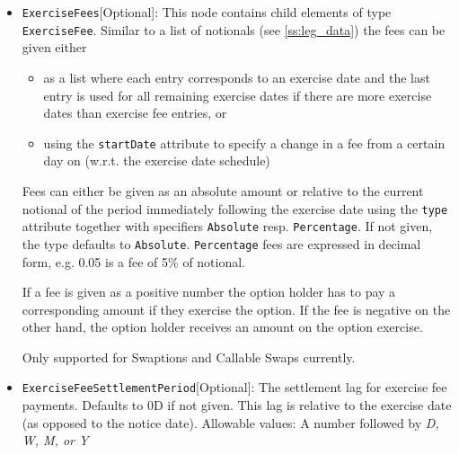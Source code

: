 \begin{itemize}
\emph{PhysicalOTC} = OTC traded swaptions with physical settlement\\
\emph{PhysicalCleared} = Cleared swaptions with physical settlement\\
\emph{CollateralizedCashPrice} = Cash settled swaptions with settlement price calculation using zero coupon curve discounting \\
\emph{ParYieldCurve}  = Cash settled swaptions with settlement price calculation using par yield discounting \footnote{https://www.isda.org/book/2006-isda-definitions/} \footnote{https://www.isda.org/a/TlAEE/Supplement-No-58-to-ISDA-2006-Definitions.pdf} \\

\item \lstinline!ExerciseFees![Optional]: This node contains child elements of type \lstinline!ExerciseFee!. Similar to a list of notionals
  (see \ref{ss:leg_data}) the fees can be given either

  \begin{itemize}
  \item as a list where each entry corresponds to an exercise date and the last entry is used for all remaining exercise
    dates if there are more exercise dates than exercise fee entries, or
  \item using the \verb+startDate+ attribute to specify a change in a fee from a certain day on (w.r.t. the exercise
    date schedule)
  \end{itemize}

  Fees can either be given as an absolute amount or relative to the current notional of the period immediately following
  the exercise date using the \verb+type+ attribute together with specifiers \verb+Absolute+ resp. \verb+Percentage+. If
  not given, the type defaults to \verb+Absolute+. \verb+Percentage+ fees are expressed in decimal form, e.g. 0.05 is a fee of 5\% of notional.

  If a fee is given as a positive number the option holder has to pay a corresponding amount if they exercise the
  option. If the fee is negative on the other hand, the option holder receives an amount on the option exercise.

  Only supported for Swaptions and Callable Swaps currently.

\item \lstinline!ExerciseFeeSettlementPeriod![Optional]: The settlement lag for exercise fee payments. Defaults to 0D if not
  given. This lag is relative to the exercise date (as opposed to the notice date). Allowable values: A number followed by \emph{D, W, M, or Y}


\end{itemize}
